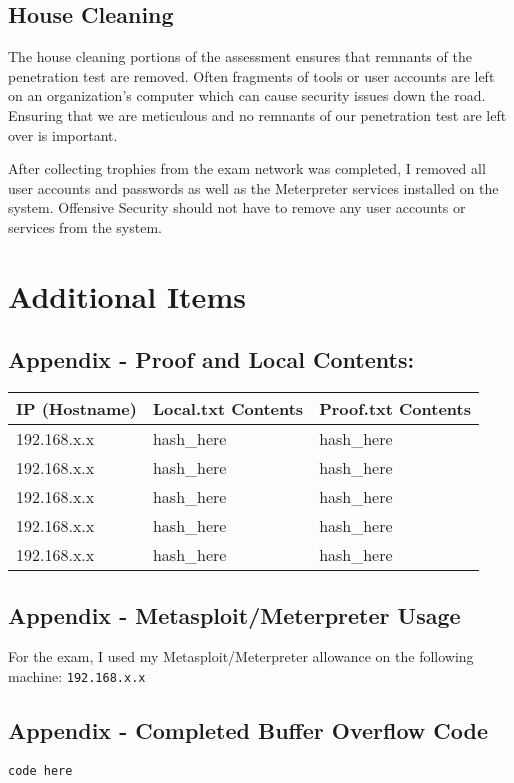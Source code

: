 \hypertarget{house-cleaning}{%
\subsection{House Cleaning}\label{house-cleaning}}

The house cleaning portions of the assessment ensures that remnants of
the penetration test are removed. Often fragments of tools or user
accounts are left on an organization's computer which can cause security
issues down the road. Ensuring that we are meticulous and no remnants of
our penetration test are left over is important.

After collecting trophies from the exam network was completed, I removed
all user accounts and passwords as well as the Meterpreter services
installed on the system. Offensive Security should not have to remove
any user accounts or services from the system.

\hypertarget{additional-items}{%
\section{Additional Items}\label{additional-items}}

\hypertarget{appendix---proof-and-local-contents}{%
\subsection{Appendix - Proof and Local
Contents:}\label{appendix---proof-and-local-contents}}

\begin{longtable}[]{@{}lll@{}}
\toprule
IP (Hostname) & Local.txt Contents & Proof.txt Contents \\
\midrule
\endhead
192.168.x.x & hash\_here & hash\_here \\
192.168.x.x & hash\_here & hash\_here \\
192.168.x.x & hash\_here & hash\_here \\
192.168.x.x & hash\_here & hash\_here \\
192.168.x.x & hash\_here & hash\_here \\
\bottomrule
\end{longtable}

\hypertarget{appendix---metasploitmeterpreter-usage}{%
\subsection{Appendix - Metasploit/Meterpreter
Usage}\label{appendix---metasploitmeterpreter-usage}}

For the exam, I used my Metasploit/Meterpreter allowance on the
following machine: \texttt{192.168.x.x}

\hypertarget{appendix---completed-buffer-overflow-code}{%
\subsection{Appendix - Completed Buffer Overflow
Code}\label{appendix---completed-buffer-overflow-code}}

\begin{verbatim}
code here
\end{verbatim}

